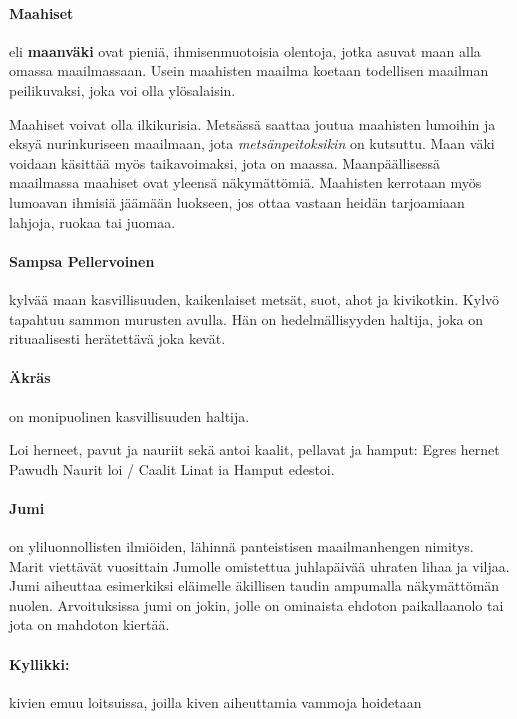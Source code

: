   \paragraph{Maahiset} eli \textbf{maanväki} ovat pieniä, ihmisenmuotoisia olentoja, jotka asuvat maan 
    alla omassa maailmassaan. Usein maahisten maailma koetaan todellisen maailman peilikuvaksi, 
    joka voi olla ylösalaisin. \par Maahiset voivat olla ilkikurisia. Metsässä saattaa joutua maahisten 
    lumoihin ja eksyä nurinkuriseen maailmaan, jota \emph{metsänpeitoksikin} on kutsuttu. Maan väki 
    voidaan käsittää myös taikavoimaksi, jota on maassa. Maanpäällisessä maailmassa maahiset ovat 
    yleensä näkymättömiä. Maahisten kerrotaan myös lumoavan ihmisiä jäämään luokseen, jos ottaa 
    vastaan heidän tarjoamiaan lahjoja, ruokaa tai juomaa.
  \paragraph{Sampsa Pellervoinen} kylvää maan kasvillisuuden, kaikenlaiset metsät, suot, ahot 
    ja kivikotkin. Kylvö tapahtuu sammon murusten avulla. Hän on hedelmällisyyden haltija, joka on 
    rituaalisesti herätettävä joka kevät. 
  \paragraph{Äkräs} on monipuolinen kasvillisuuden haltija. \begin{em}Loi herneet, pavut ja 
    nauriit sekä antoi kaalit, pellavat ja hamput: Egres hernet Pawudh Naurit loi / Caalit Linat 
    ia Hamput edestoi.\end{em}
  \paragraph{Jumi} on yliluonnollisten ilmiöiden, lähinnä panteistisen maailmanhengen nimitys. 
    Marit viettävät vuosittain Jumolle omistettua juhlapäivää uhraten lihaa ja viljaa. Jumi 
    aiheuttaa esimerkiksi eläimelle äkillisen taudin ampumalla näkymättömän nuolen. Arvoituksissa 
    jumi on jokin, jolle on ominaista ehdoton paikallaanolo tai jota on mahdoton kiertää.
    
    \paragraph{Kyllikki:} kivien emuu loitsuissa, joilla kiven aiheuttamia vammoja hoidetaan
